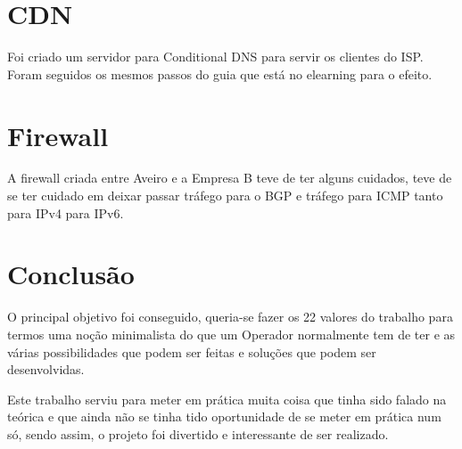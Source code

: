 \documentclass[pdftex,12pt,a4paper]{report}
\begin{document}
\section{CDN}

Foi criado um servidor para Conditional DNS para servir os clientes do ISP. Foram seguidos os mesmos passos do guia que está no elearning para o efeito.

\section{Firewall}

A firewall criada entre Aveiro e a Empresa B teve de ter alguns cuidados, teve de se ter cuidado em deixar passar tráfego para o BGP e tráfego para ICMP tanto para IPv4 para IPv6.

\newpage

\section{Conclusão}

O principal objetivo foi conseguido, queria-se fazer os 22 valores do trabalho para termos uma noção minimalista do que um Operador normalmente tem de ter e as várias possibilidades que podem ser feitas e soluções que podem ser desenvolvidas. 

Este trabalho serviu para meter em prática muita coisa que tinha sido falado na teórica e que ainda não se tinha tido oportunidade de se meter em prática num só, sendo assim, o projeto foi divertido e interessante de ser realizado.
\end{document}
